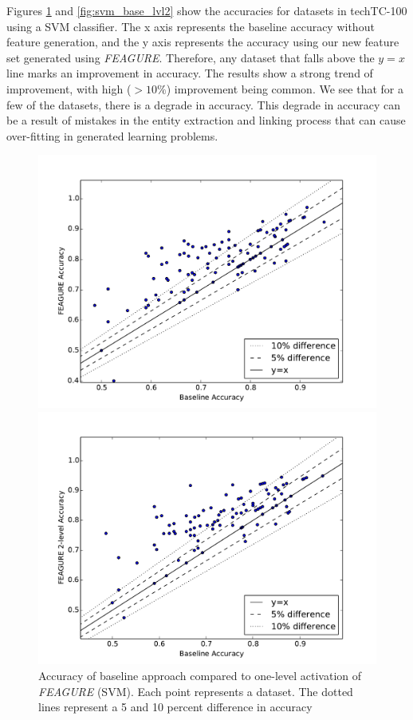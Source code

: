 \documentclass[twoside,11pt]{article}
\theoremstyle{definition}
\begin{document}
Figures \ref{fig:svm_base_lvl1} and \ref{fig:svm_base_lvl2} show the accuracies for datasets in techTC-100 using a SVM classifier. The x axis represents the baseline accuracy without feature generation, and the y axis represents the accuracy using our new feature set generated using \emph{FEAGURE}. Therefore, any dataset that falls above the $y=x$ line marks an improvement in accuracy. 
The results show a strong trend of improvement, with high ($>10\%$) improvement being common.
We see that for a few of the datasets, there is a degrade in accuracy. This degrade in accuracy can be a result of mistakes in the entity extraction and linking process that can cause over-fitting in generated learning problems.

\begin{figure}
	\centering
	\begin{minipage}{0.45\textwidth}
		\centering
		\includegraphics[width=1.2\textwidth]{svm_full} %
		\caption{Accuracy of
			baseline approach compared to one-level activation of \emph{FEAGURE} (SVM). Each point represents a dataset. The dotted lines represent a 5 and 10 percent difference in accuracy}
		\label{fig:svm_base_lvl1}
	\end{minipage}\hfill
	\begin{minipage}{0.45\textwidth}
		\centering
		\includegraphics[width=1.2\textwidth]{svm_full_lvl2} %

\end{minipage}
\end{figure}
\end{document}
